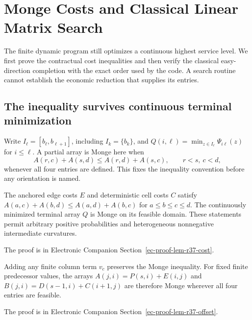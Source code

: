 \section{Monge Costs and Classical Linear Matrix Search}\label{sec:r37-search}
The finite dynamic program still optimizes a continuous highest service level. We first prove the contractual cost inequalities and then verify the classical easy-direction completion with the exact order used by the code. A search routine cannot establish the economic reduction that supplies its entries.

\subsection{The inequality survives continuous terminal minimization}
Write $I_\ell=[b_\ell,b_{\ell+1}]$, including $I_k=\{b_k\}$, and $Q(i,\ell)=\min_{z\in I_\ell}\Psi_{i\ell}(z)$ for $i\leq\ell$. A partial array is Monge here when
\begin{equation}\label{eq:r37-monge}
 A(r,c)+A(s,d)\leq A(r,d)+A(s,c),\qquad r<s,\ c<d,
\end{equation}
whenever all four entries are defined. This fixes the inequality convention before any orientation is named.

\begin{lemma}\label{lem:r37-cost}
The anchored edge costs $E$ and deterministic cell costs $C$ satisfy $A(a,c)+A(b,d)\leq A(a,d)+A(b,c)$ for $a\leq b\leq c\leq d$. The continuously minimized terminal array $Q$ is Monge on its feasible domain. These statements permit arbitrary positive probabilities and heterogeneous nonnegative intermediate curvatures.
\end{lemma}
\noindent The proof is in Electronic Companion Section~\ref{ec-proof-lem-r37-cost}.


\begin{lemma}\label{lem:r37-offset}
Adding any finite column term $v_c$ preserves the Monge inequality. For fixed finite predecessor values, the arrays $A(j,i)=P(s,i)+E(i,j)$ and $B(j,i)=D(s-1,i)+C(i+1,j)$ are therefore Monge wherever all four entries are feasible.
\end{lemma}
\noindent The proof is in Electronic Companion Section~\ref{ec-proof-lem-r37-offset}.


